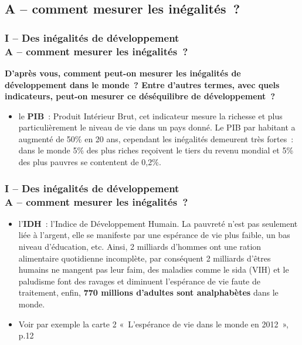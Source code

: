 \documentclass[C]{beamer}
\begin{document}
	\subsection*{A -- comment mesurer les inégalités~?}
	\begin{frame}
	\frametitle{I -- Des inégalités de développement\\ A -- comment mesurer les inégalités~?}
	\begin{center}
	\textbf{D'après vous, comment peut-on mesurer les inégalités de développement dans le monde~? Entre d'autres termes, avec quels indicateurs, peut-on mesurer ce déséquilibre de développement~?}\\
\pause
	\end{center}
	\begin{itemize}
	\item le \textbf{PIB}~: Produit Intérieur Brut, cet indicateur mesure la richesse et plus particulièrement le niveau de vie dans un pays donné. Le PIB par habitant a augmenté de 50\% en 20 ans, cependant les inégalités demeurent très fortes~: dans le monde 5\% des plus riches reçoivent le tiers du revenu mondial et 5\% des plus pauvres se contentent de 0,2\%.
	\end{itemize}
	\end{frame}
	
	
	
	\begin{frame}
	\frametitle{I -- Des inégalités de développement\\ A -- comment mesurer les inégalités~?}
	\begin{itemize}
	\item l'\textbf{IDH}~: l'Indice de Développement Humain. La pauvreté n'est pas seulement liée à l'argent, elle se manifeste par une espérance de vie plus faible, un bas niveau d'éducation, etc. Ainsi, 2 milliards d'hommes ont une ration alimentaire quotidienne incomplète, par conséquent 2 milliards d'êtres humains ne mangent pas leur faim, des maladies comme le sida (VIH) et le paludisme font des ravages et diminuent l'espérance de vie faute de traitement, enfin, \textbf{770 millions d'adultes sont analphabètes} dans le monde.
	\item Voir par exemple la carte 2 «~L'espérance de vie dans le monde en 2012~», p.12
	\end{itemize}
	\end{frame}
	
\end{document}
